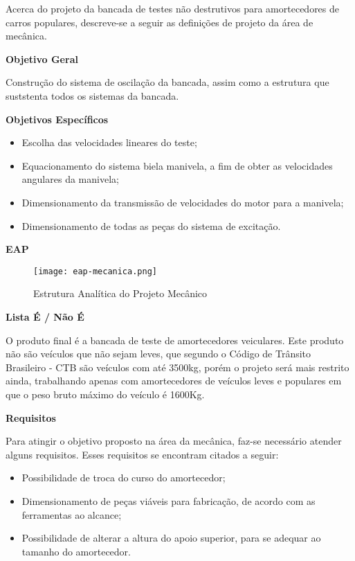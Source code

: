 	Acerca do projeto da bancada de testes não destrutivos para amortecedores de carros populares, descreve-se a seguir as definições de projeto da área de mecânica.

	\textbf{Objetivo Geral}

	Construção do sistema de oscilação da bancada, assim como a estrutura que suststenta todos os sistemas da bancada.

	\textbf{Objetivos Específicos}

	\begin{itemize}
		\item Escolha das velocidades lineares do teste;
		\item Equacionamento do sistema biela manivela, a fim de obter as velocidades angulares da manivela;
		\item Dimensionamento da transmissão de velocidades do motor para a manivela;
		\item Dimensionamento de todas as peças do sistema de excitação.
	\end{itemize}

	\textbf{EAP}

	\begin{figure}[!h]
		\centering
		\texttt{[image: eap-mecanica.png]}
		\caption{Estrutura Analítica do Projeto Mecânico}
		\label{eap-energia}
	\end{figure}

	\textbf{Lista É / Não É}

		O produto final é a bancada de teste de amortecedores veiculares. Este produto não são veículos que não sejam leves, que segundo o Código de Trânsito Brasileiro - CTB são veículos com até 3500kg, porém o projeto será mais restrito ainda, trabalhando apenas com amortecedores de veículos leves e populares em que o peso bruto máximo do veículo é 1600Kg.

	\textbf{Requisitos}

		Para atingir o objetivo proposto na área da mecânica, faz-se necessário atender alguns requisitos. Esses requisitos se encontram citados a seguir:

		\begin{itemize}
			\item Possibilidade de troca do curso do amortecedor;
			\item Dimensionamento de peças viáveis para fabricação, de acordo com as ferramentas ao alcance;
			\item Possibilidade de alterar a altura do apoio superior, para se adequar ao tamanho do amortecedor.

		\end{itemize}


